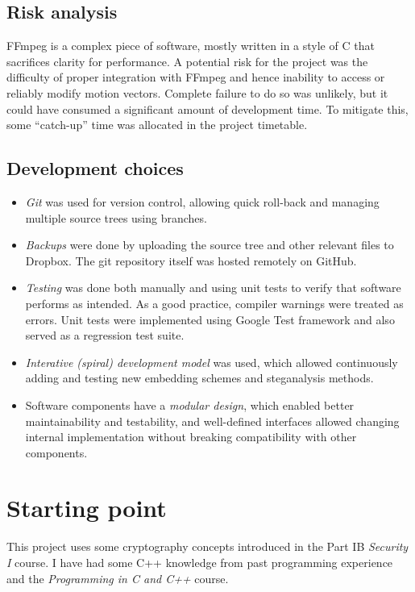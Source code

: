 \documentclass[12pt,british,twoside,notitlepage,usenames,dvipsnames,hypens,final]{report}
\numberwithin{equation}{section}
\numberwithin{figure}{section}
\begin{document}
\subsection{Risk analysis}
FFmpeg is a complex piece of software, mostly written in a style of C that sacrifices clarity for performance. A potential risk for the project was the difficulty of proper integration with FFmpeg and hence inability to access or reliably modify motion vectors. Complete failure to do so was unlikely, but it could have consumed a significant amount of development time. To mitigate this, some ``catch-up'' time was allocated in the project timetable.  

\subsection{Development choices}
\begin{itemize}
\item \emph{Git} was used for version control, allowing quick roll-back and managing multiple source trees using branches.
\item \emph{Backups} were done by uploading the source tree and other relevant files to Dropbox. The git repository itself was hosted remotely on GitHub.
\item \emph{Testing} was done both manually and using unit tests to verify that software performs as intended. As a good practice, compiler warnings were treated as errors. Unit tests were implemented using Google Test framework and also served as a regression test suite.
\item \emph{Interative (spiral) development model} was used, which allowed continuously adding and testing new embedding schemes and steganalysis methods.
\item Software components have a \emph{modular design}, which enabled better maintainability and testability, and well-defined interfaces allowed changing internal implementation without breaking compatibility with other components.
\end{itemize}

\section{Starting point}
This project uses some cryptography concepts introduced in the Part IB \textit{Security I} course. I have had some C++ knowledge from past programming experience and the \textit{Programming in C and C++} course. 
\end{document}
